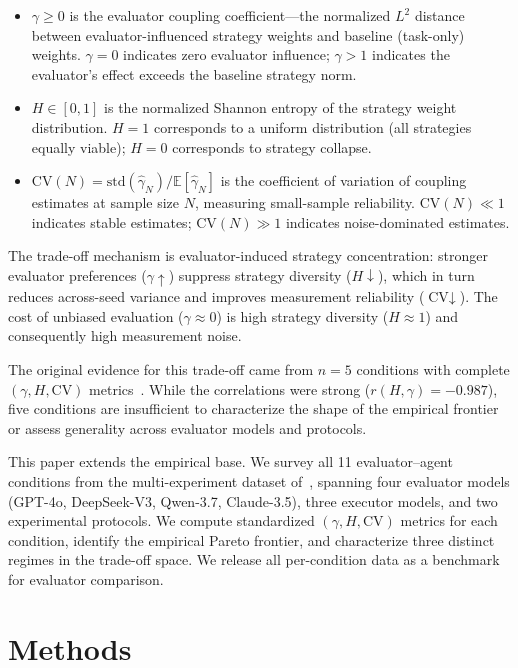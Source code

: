 \documentclass[11pt]{article}
\begin{document}
\begin{itemize}[leftmargin=*,nosep]
 \item $\gamma \geq 0$ is the evaluator coupling coefficient---the normalized $L^2$ distance between evaluator-influenced strategy weights and baseline (task-only) weights. $\gamma = 0$ indicates zero evaluator influence; $\gamma > 1$ indicates the evaluator's effect exceeds the baseline strategy norm.
 \item $H \in [0, 1]$ is the normalized Shannon entropy of the strategy weight distribution. $H = 1$ corresponds to a uniform distribution (all strategies equally viable); $H = 0$ corresponds to strategy collapse.
 \item $\text{CV}(N) = \text{std}(\hat{\gamma}_N) / \mathbb{E}[\hat{\gamma}_N]$ is the coefficient of variation of coupling estimates at sample size $N$, measuring small-sample reliability. $\text{CV}(N) \ll 1$ indicates stable estimates; $\text{CV}(N) \gg 1$ indicates noise-dominated estimates.
\end{itemize}

The trade-off mechanism is evaluator-induced strategy concentration: stronger evaluator preferences ($\gamma \uparrow$) suppress strategy diversity ($H \downarrow$), which in turn reduces across-seed variance and improves measurement reliability ($\text{CV} \downarrow$). The cost of unbiased evaluation ($\gamma \approx 0$) is high strategy diversity ($H \approx 1$) and consequently high measurement noise.

The original evidence for this trade-off came from $n{=}5$ conditions with complete $(\gamma, H, \text{CV})$ metrics~\cite{liu2026triangle}. While the correlations were strong ($r(H, \gamma) = -0.987$), five conditions are insufficient to characterize the shape of the empirical frontier or assess generality across evaluator models and protocols.

This paper extends the empirical base. We survey all 11 evaluator--agent conditions from the multi-experiment dataset of~\cite{liu2026mmepc}, spanning four evaluator models (GPT-4o, DeepSeek-V3, Qwen-3.7, Claude-3.5), three executor models, and two experimental protocols. We compute standardized $(\gamma, H, \text{CV})$ metrics for each condition, identify the empirical Pareto frontier, and characterize three distinct regimes in the trade-off space. We release all per-condition data as a benchmark for evaluator comparison.

\section{Methods}
\end{document}
